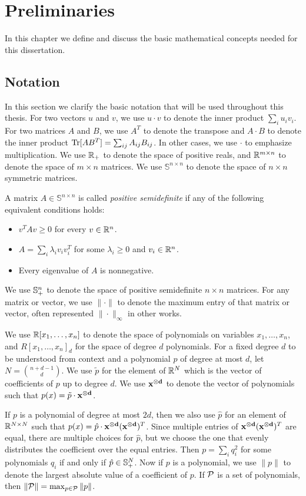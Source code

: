 \chapter{Preliminaries}\label{cha:prelims}
In this chapter we define and discuss the basic mathematical concepts needed for this dissertation.

\section{Notation}
In this section we clarify the basic notation that will be used throughout this thesis. For two vectors $u$ and $v$, we use $u \cdot v$ to denote the inner product $\sum_i u_i v_i$. For two matrices $A$ and $B$, we use $A^T$ to denote the transpose and $A \cdot B$ to denote the inner product $\operatorname{Tr}[AB^T] = \sum_{ij} A_{ij}B_{ij}$. In other cases, we use $\cdot$ to emphasize multiplication. We use $\mathbb R_+$ to denote the space of positive reals, and $\mathbb R^{m \times n}$ to denote the space of $m \times n$ matrices. We use $\mathbb{S}^{n \times n}$ to denote the space of $n \times n$ symmetric matrices.
\begin{definition}
A matrix $A \in \mathbb{S}^{n \times n}$ is called \emph{positive semidefinite} if any of the following equivalent conditions holds:
\begin{itemize}
\item $v^TAv \geq 0$ for every $v \in \mathbb R^n$.
\item $A = \sum_i \lambda_i v_iv_i^T$ for some $\lambda_i \geq 0$ and $v_i \in \mathbb R^n$.
\item Every eigenvalue of $A$ is nonnegative.
\end{itemize}
\end{definition}
We use $\mathbb{S}^{n}_+$ to denote the space of positive semidefinite $n \times n$ matrices. For any matrix or vector, we use $\|\cdot\|$ to denote the maximum entry of that matrix or vector, often represented $\|\cdot\|_\infty$ in other works. 

We use $\mathbb R[x_1,\dots,x_n]$ to denote the space of polynomials on variables $x_1,\dots,x_n$, and $R[x_1,\dots,x_n]_d$ for the space of degree $d$ polynomials.
For a fixed degree $d$ to be understood from context and a polynomial $p$ of degree at most $d$, let $N = \binom{n+d-1}{d}$. We use $\tilde{p}$ for the element of $\mathbb R^{N}$ which is the vector of coefficients of $p$ up to degree $d$. We use $\mathbf{x^{\otimes d}}$ to denote the vector of polynomials such that $p(x) = \tilde{p} \cdot \mathbf{x^{\otimes d}}$.

If $p$ is a polynomial of degree at most $2d$, then we also use $\hat{p}$ for an element of $\mathbb R^{N \times N}$ such that $p(x) = \hat{p} \cdot \mathbf{x^{\otimes d}}(\mathbf{x^{\otimes d}})^T$. Since multiple entries of $\mathbf{x^{\otimes d}}(\mathbf{x^{\otimes d}})^T$ are equal, there are multiple choices for $\hat{p}$, but we choose the one that evenly distributes the coefficient over the equal entries. Then $p = \sum_i q_i^2$ for some polynomials $q_i$ if and only if $\hat{p} \in \mathbb{S}^{N}_+$. Now if $p$ is a polynomial, we use $\|p\|$ to denote the largest absolute value of a coefficient of $p$. If $\mathcal P$ is a set of polynomials, then $\|\mathcal P\| = \max_{p \in \mathcal P} \|p\|$. 

